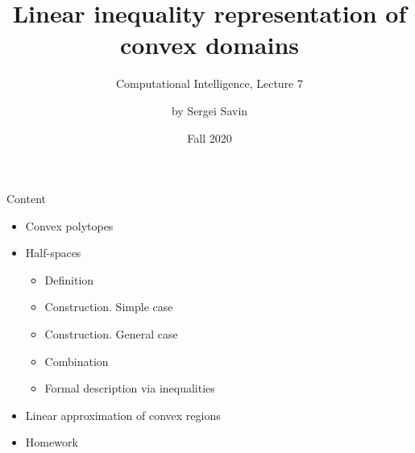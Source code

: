 \documentclass{beamer}
\title{Linear inequality representation of convex domains}
\subtitle{Computational Intelligence, Lecture 7}
\author{by Sergei Savin}
\date{Fall 2020}
\begin{document}
\maketitle


\begin{frame}{Content}

\begin{itemize}
\item Convex polytopes
\item Half-spaces
\begin{itemize}
\item Definition
\item Construction. Simple case
\item Construction. General case
\item Combination
\item Formal description via inequalities
\end{itemize}
\item Linear approximation of convex regions
\item Homework
\end{itemize}

\end{frame}
\end{document}
